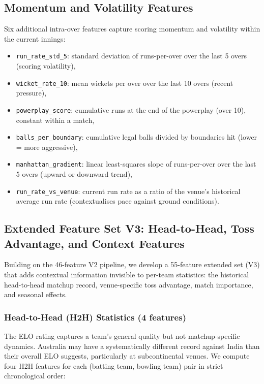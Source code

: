 \documentclass[12pt,a4paper,oneside]{report}
\begin{document}
\subsection{Momentum and Volatility Features}

Six additional intra-over features capture scoring momentum and volatility within the current innings:

\begin{itemize}[nosep]
    \item \texttt{run\_rate\_std\_5}: standard deviation of runs-per-over over the last 5 overs (scoring volatility),
    \item \texttt{wicket\_rate\_10}: mean wickets per over over the last 10 overs (recent pressure),
    \item \texttt{powerplay\_score}: cumulative runs at the end of the powerplay (over 10), constant within a match,
    \item \texttt{balls\_per\_boundary}: cumulative legal balls divided by boundaries hit (lower = more aggressive),
    \item \texttt{manhattan\_gradient}: linear least-squares slope of runs-per-over over the last 5 overs (upward or downward trend),
    \item \texttt{run\_rate\_vs\_venue}: current run rate as a ratio of the venue's historical average run rate (contextualises pace against ground conditions).
\end{itemize}

\subsection{Extended Feature Set V3: Head-to-Head, Toss Advantage, and Context Features}
\label{sec:features_v3}

Building on the 46-feature V2 pipeline, we develop a 55-feature extended set (V3) that adds contextual information invisible to per-team statistics: the historical head-to-head matchup record, venue-specific toss advantage, match importance, and seasonal effects.

\subsubsection*{Head-to-Head (H2H) Statistics (4 features)}

The ELO rating captures a team's general quality but not matchup-specific dynamics.  Australia may have a systematically different record against India than their overall ELO suggests, particularly at subcontinental venues.  We compute four H2H features for each (batting team, bowling team) pair in strict chronological order:
\end{document}
